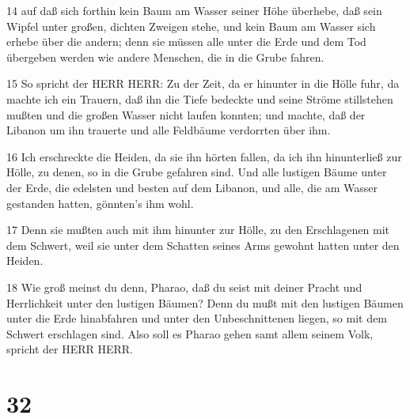 \par 14 auf daß sich forthin kein Baum am Wasser seiner Höhe überhebe, daß sein Wipfel unter großen, dichten Zweigen stehe, und kein Baum am Wasser sich erhebe über die andern; denn sie müssen alle unter die Erde und dem Tod übergeben werden wie andere Menschen, die in die Grube fahren.
\par 15 So spricht der HERR HERR: Zu der Zeit, da er hinunter in die Hölle fuhr, da machte ich ein Trauern, daß ihn die Tiefe bedeckte und seine Ströme stillstehen mußten und die großen Wasser nicht laufen konnten; und machte, daß der Libanon um ihn trauerte und alle Feldbäume verdorrten über ihm.
\par 16 Ich erschreckte die Heiden, da sie ihn hörten fallen, da ich ihn hinunterließ zur Hölle, zu denen, so in die Grube gefahren sind. Und alle lustigen Bäume unter der Erde, die edelsten und besten auf dem Libanon, und alle, die am Wasser gestanden hatten, gönnten's ihm wohl.
\par 17 Denn sie mußten auch mit ihm hinunter zur Hölle, zu den Erschlagenen mit dem Schwert, weil sie unter dem Schatten seines Arms gewohnt hatten unter den Heiden.
\par 18 Wie groß meinst du denn, Pharao, daß du seist mit deiner Pracht und Herrlichkeit unter den lustigen Bäumen? Denn du mußt mit den lustigen Bäumen unter die Erde hinabfahren und unter den Unbeschnittenen liegen, so mit dem Schwert erschlagen sind. Also soll es Pharao gehen samt allem seinem Volk, spricht der HERR HERR.

\chapter{32}

